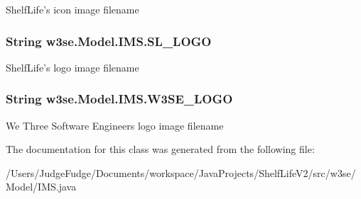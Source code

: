 Shelf\-Life's icon image filename \hypertarget{classw3se_1_1_model_1_1_i_m_s_a9309c235b5a4dc95714257769f663d3d}{
\subsubsection[{S\-L\-\_\-\-L\-O\-G\-O}]{\setlength{\rightskip}{0pt plus 5cm}String w3se.\-Model.\-I\-M\-S.\-S\-L\-\_\-\-L\-O\-G\-O}}\label{classw3se_1_1_model_1_1_i_m_s_a9309c235b5a4dc95714257769f663d3d}
Shelf\-Life's logo image filename \hypertarget{classw3se_1_1_model_1_1_i_m_s_a39e505844130ace37f4c8e351ea6ec87}{
\subsubsection[{W3\-S\-E\-\_\-\-L\-O\-G\-O}]{\setlength{\rightskip}{0pt plus 5cm}String w3se.\-Model.\-I\-M\-S.\-W3\-S\-E\-\_\-\-L\-O\-G\-O}}\label{classw3se_1_1_model_1_1_i_m_s_a39e505844130ace37f4c8e351ea6ec87}
We Three Software Engineers logo image filename 

The documentation for this class was generated from the following file\-:\begin{DoxyCompactItemize}
\item 
/\-Users/\-Judge\-Fudge/\-Documents/workspace/\-Java\-Projects/\-Shelf\-Life\-V2/src/w3se/\-Model/I\-M\-S.\-java\end{DoxyCompactItemize}

